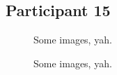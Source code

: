 \lipsum[1]


\clearpage

\subsection{Participant 15}

\begin{figure}[h]
	\caption{Some images, yah.}
\end{figure}

\lipsum[1]

\clearpage

\begin{figure}[h]
	\caption{Some images, yah.}
\end{figure}

\lipsum[1]

